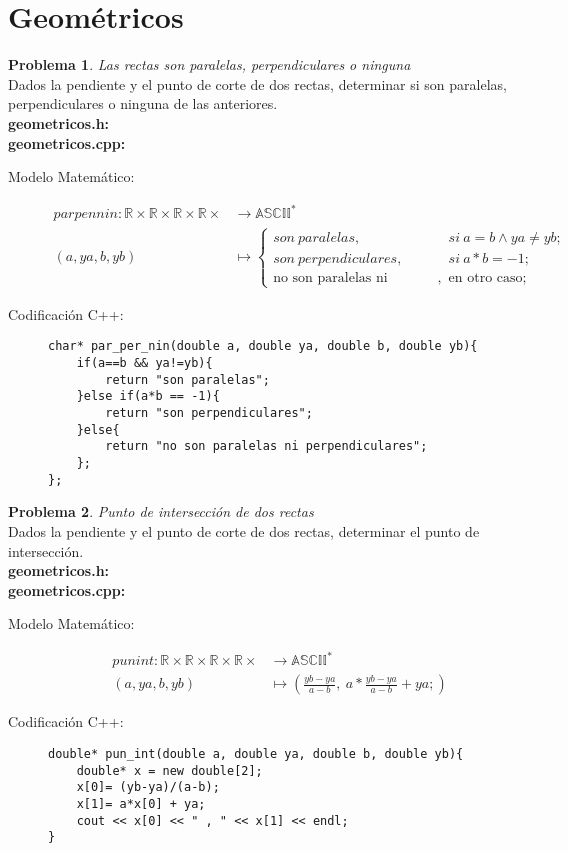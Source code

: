 \documentclass{article}
\theoremstyle{plain}
\theoremstyle{definition}
\newtheorem{problem}{Problema}
\begin{document}
\section{Geométricos}

\begin{problem} \emph{Las rectas son paralelas, perpendiculares o ninguna}\\
Dados la pendiente y el punto de corte de dos rectas, determinar si son paralelas, perpendiculares o ninguna de las anteriores.\\
\textbf{geometricos.h:}\ \\
\textbf{geometricos.cpp:}\ 
%
\begin{description}
\item[Modelo Matemático:]
%
\begin{align*}
par pen nin: \mathbb{R}\times\mathbb{R}\times\mathbb{R}\times\mathbb{R}\times &\to \mathbb{ASCII}^*\\
(a,ya,b,yb) &\mapsto
\begin{cases}
son\ paralelas,& si\ a=b \wedge ya\not=yb;\\
son\ perpendiculares,& si\ a*b=-1;\\
\text{no son paralelas ni perpendiculares},& \text{en otro caso;}
\end{cases}
\end{align*}
%
\item[Codificación \textsf{C++}:]\hfill
%
\begin{verbatim}
char* par_per_nin(double a, double ya, double b, double yb){
    if(a==b && ya!=yb){
        return "son paralelas";
    }else if(a*b == -1){
        return "son perpendiculares";
    }else{
        return "no son paralelas ni perpendiculares";
    };
};
\end{verbatim}
\end{description}
\end{problem}

\begin{problem} \emph{Punto de intersección de dos rectas}\\
Dados la pendiente y el punto de corte de dos rectas, determinar el punto de intersección.\\
\textbf{geometricos.h:}\ \\
\textbf{geometricos.cpp:}\ 
%
\begin{description}
\item[Modelo Matemático:]
%
\begin{align*}
pun int: \mathbb{R}\times\mathbb{R}\times\mathbb{R}\times\mathbb{R}\times &\to \mathbb{ASCII}^*\\
(a,ya,b,yb) &\mapsto (\frac{yb-ya}{a-b} ,\ a*\frac{yb-ya}{a-b} + ya;)
\end{align*}
%
\item[Codificación \textsf{C++}:]\hfill
%
\begin{verbatim}
double* pun_int(double a, double ya, double b, double yb){
    double* x = new double[2];
    x[0]= (yb-ya)/(a-b);
    x[1]= a*x[0] + ya;
    cout << x[0] << " , " << x[1] << endl;
}
\end{verbatim}
\end{description}
\end{problem}
\end{document}

